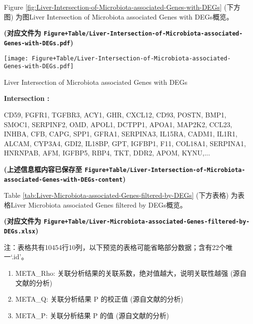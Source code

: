 \documentclass[
]{article}
\providecommand{\tightlist}{%
  \setlength{\itemsep}{0pt}\setlength{\parskip}{0pt}}
\begin{document}
Figure \ref{fig:Liver-Intersection-of-Microbiota-associated-Genes-with-DEGs} (下方图) 为图Liver Intersection of Microbiota associated Genes with DEGs概览。

\textbf{(对应文件为 \texttt{Figure+Table/Liver-Intersection-of-Microbiota-associated-Genes-with-DEGs.pdf})}

\def\@captype{figure}
\begin{center}
\texttt{[image: Figure+Table/Liver-Intersection-of-Microbiota-associated-Genes-with-DEGs.pdf]}
\caption{Liver Intersection of Microbiota associated Genes with DEGs}\label{fig:Liver-Intersection-of-Microbiota-associated-Genes-with-DEGs}
\end{center}
\begin{center}\begin{tcolorbox}[colback=gray!10, colframe=gray!50, width=0.9\linewidth, arc=1mm, boxrule=0.5pt]
\textbf{
Intersection
:}

\vspace{0.5em}

    CD59, FGFR1, TGFBR3, ACY1, GHR, CXCL12, CD93, POSTN,
BMP1, SMOC1, SERPINF2, OMD, APOL1, DCTPP1, APOA1, MAP2K2,
CCL23, INHBA, CFB, CAPG, SPP1, GFRA1, SERPINA3, IL15RA,
CADM1, IL1R1, ALCAM, CYP3A4, GDI2, IL18BP, GPT, IGFBP1,
F11, COL18A1, SERPINA1, HNRNPAB, AFM, IGFBP5, RBP4, TKT,
DDR2, APOM, KYNU,...

\vspace{2em}
\end{tcolorbox}
\end{center}

\textbf{(上述信息框内容已保存至 \texttt{Figure+Table/Liver-Intersection-of-Microbiota-associated-Genes-with-DEGs-content})}

Table \ref{tab:Liver-Microbiota-associated-Genes-filtered-by-DEGs} (下方表格) 为表格Liver Microbiota associated Genes filtered by DEGs概览。

\textbf{(对应文件为 \texttt{Figure+Table/Liver-Microbiota-associated-Genes-filtered-by-DEGs.xlsx})}

\begin{center}\begin{tcolorbox}[colback=gray!10, colframe=gray!50, width=0.9\linewidth, arc=1mm, boxrule=0.5pt]注：表格共有10454行10列，以下预览的表格可能省略部分数据；含有22个唯一`.id'。
\end{tcolorbox}
\end{center}
\begin{center}\begin{tcolorbox}[colback=gray!10, colframe=gray!50, width=0.9\linewidth, arc=1mm, boxrule=0.5pt]\begin{enumerate}\tightlist
\item META\_Rho:  关联分析结果的关联系数，绝对值越大，说明关联性越强 (源自文献的分析)
\item META\_Q:  关联分析结果 P 的校正值 (源自文献的分析)
\item META\_P:  关联分析结果 P 的值 (源自文献的分析)
\end{enumerate}\end{tcolorbox}
\end{center}
\end{document}
